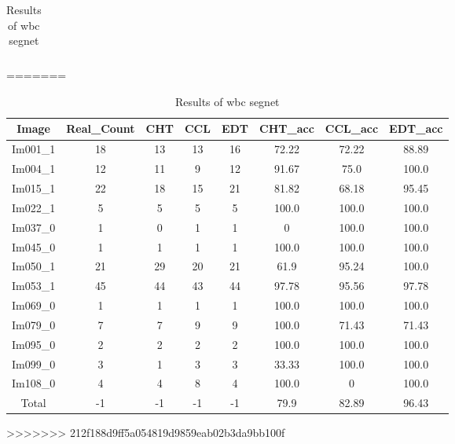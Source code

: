 \begin{table}[H]
\begin{tabular}{|c|c|c|c|c|c|c|c|}
    \hline
    \end{tabular}
    \caption{Results of each algorithm}
    \label{Results of each algorithm}
=======
\centering
\begin{tabular}{|c|c|c|c|c|c|c|c|}
\hline
 \textbf{Image} & \textbf{Real\_Count} & \textbf{CHT} & \textbf{CCL} & \textbf{EDT} & \textbf{CHT\_acc} & \textbf{CCL\_acc} & \textbf{EDT\_acc} \\ \hline
 Im001\_1 & 18 & 13 & 13 & 16 & 72.22 & 72.22 & 88.89 \\ 
 Im004\_1 & 12 & 11 & 9 & 12 & 91.67 & 75.0 & 100.0 \\ 
 Im015\_1 & 22 & 18 & 15 & 21 & 81.82 & 68.18 & 95.45 \\ 
 Im022\_1 & 5 & 5 & 5 & 5 & 100.0 & 100.0 & 100.0 \\ 
 Im037\_0 & 1 & 0 & 1 & 1 & 0 & 100.0 & 100.0 \\ 
 Im045\_0 & 1 & 1 & 1 & 1 & 100.0 & 100.0 & 100.0 \\ 
 Im050\_1 & 21 & 29 & 20 & 21 & 61.9 & 95.24 & 100.0 \\ 
 Im053\_1 & 45 & 44 & 43 & 44 & 97.78 & 95.56 & 97.78 \\ 
 Im069\_0 & 1 & 1 & 1 & 1 & 100.0 & 100.0 & 100.0 \\ 
 Im079\_0 & 7 & 7 & 9 & 9 & 100.0 & 71.43 & 71.43 \\ 
 Im095\_0 & 2 & 2 & 2 & 2 & 100.0 & 100.0 & 100.0 \\ 
 Im099\_0 & 3 & 1 & 3 & 3 & 33.33 & 100.0 & 100.0 \\ 
 Im108\_0 & 4 & 4 & 8 & 4 & 100.0 & 0 & 100.0 \\ \hline
 Total & -1 & -1 & -1 & -1 & 79.9 & 82.89 & 96.43 \\ 

\hline
\end{tabular}
\caption{Results of wbc segnet}
\label{Results of wbc segnet}
>>>>>>> 212f188d9ff5a054819d9859eab02b3da9bb100f
\end{table}
    